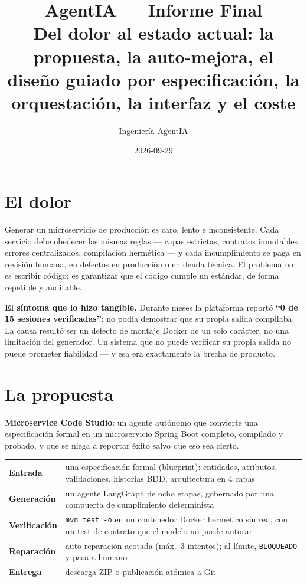\documentclass[11pt,a4paper]{article}
\title{\vspace{-1.4cm}\textbf{AgentIA --- Informe Final}\\[0.25cm]
\large Del dolor al estado actual: la propuesta, la auto-mejora, el diseño guiado por
especificación, la orquestación, la interfaz y el coste}
\author{Ingeniería AgentIA}
\date{2026-09-29}
\begin{document}
\maketitle
\thispagestyle{fancy}

\tableofcontents
\vspace{0.4cm}

\section{El dolor}

Generar un microservicio de producción es caro, lento e inconsistente. Cada servicio
debe obedecer las mismas reglas --- capas estrictas, contratos inmutables, errores
centralizados, compilación hermética --- y cada incumplimiento se paga en revisión
humana, en defectos en producción o en deuda técnica. El problema no es escribir
código; es garantizar que el código cumple un estándar, de forma repetible y auditable.

\begin{painbox}
\textbf{El síntoma que lo hizo tangible.} Durante meses la plataforma reportó
\textbf{``0 de 15 sesiones verificadas''}: no podía demostrar que su propia salida
compilaba. La causa resultó ser un defecto de montaje Docker de un solo carácter, no
una limitación del generador. Un sistema que no puede verificar su propia salida no
puede prometer fiabilidad --- y esa era exactamente la brecha de producto.
\end{painbox}

\section{La propuesta}

\textbf{Microservice Code Studio}: un agente autónomo que convierte una especificación
formal en un microservicio Spring Boot completo, compilado y probado, y que se niega a
reportar éxito salvo que eso sea cierto.

\begin{center}
\begin{tabular}{@{}p{}p{}@{}}
\toprule
\textbf{Entrada} & una especificación formal (blueprint): entidades, atributos,
validaciones, historias BDD, arquitectura en 4 capas \\
\textbf{Generación} & un agente LangGraph de ocho etapas, gobernado por una compuerta
de cumplimiento determinista \\
\textbf{Verificación} & \texttt{mvn test -o} en un contenedor Docker hermético sin red,
con un test de contrato que el modelo no puede autorar \\
\textbf{Reparación} & auto-reparación acotada (máx.\ 3 intentos); al límite, \texttt{BLOQUEADO}
y pasa a humano \\
\textbf{Entrega} & descarga ZIP o publicación atómica a Git \\
\bottomrule
\end{tabular}
\end{center}
\end{document}
